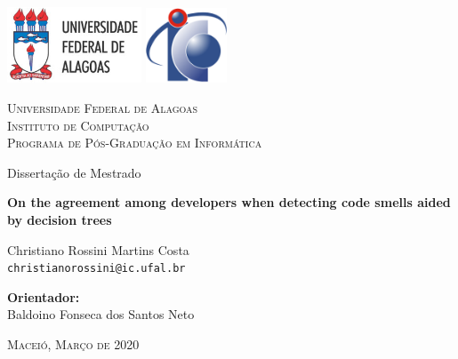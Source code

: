 \begin{figure}
    [H]
\end{figure}

\begin{flushright}

    \includegraphics[width=0.3\textwidth]{imgs/logo-ufal3.jpg}
    \includegraphics[width=0.18\textwidth]{imgs/logo-ic.png}
    
    \vspace{1cm}
    
    \textsc{\Large Universidade Federal de Alagoas}\\ \vspace{0.2cm}
    \textsc{\Large Instituto de Computação}\\ \vspace{0.2cm}    \textsc{\Large Programa de Pós-Graduação em Informática}\\
    
    \vspace{0.2cm}
    
    \vspace*{1.25cm}
    
    \Large{Dissertação de Mestrado}

    \vspace*{1.25cm}

    \textbf{\Large On the agreement among developers when detecting code smells aided by decision trees}

    \vspace{1.25cm}
    
    \Large{Christiano Rossini Martins Costa}\\
    \normalsize{\texttt{christianorossini@ic.ufal.br}}

    \vspace{1cm}
    
    \Large{\textbf{Orientador:}}\\ \vspace{0.2cm}
    \Large{Baldoino Fonseca dos Santos Neto}\\

    \vspace{1.6cm}


    \vfill

    \textsc{\normalsize \vfill Maceió, Março de 2020}\\


\end{flushright}
